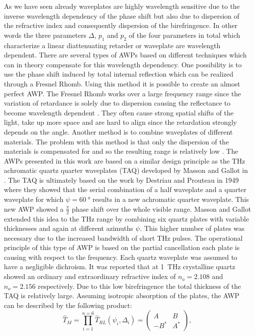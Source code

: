 As we have seen already waveplates are highly wavelength sensitive due to the inverse wavelength dependency of the phase shift but also due to dispersion of the refractive index and consequently dispersion of the birefringence. In other words the three parameters $\Delta$, $p_1$ and $p_2$ of the four parameters in total which characterize a linear diattenuating retarder or waveplate are wavelength dependent. There are several types of AWPs based on different techniques which can in theory compensate for this wavelength dependency. One possibility is to use the phase shift induced by total internal reflection which can be realized through a Fresnel Rhomb. Using this method it is possible to create an almost perfect AWP. The Fresnel Rhomb works over a large frequency range since the variation of retardance is solely due to dispersion causing the reflectance to become wavelength dependent \cite{Hecht}. They often cause strong spatial shifts of the light, take up more space and are hard to align since the retardation strongly depends on the angle. Another method is to combine waveplates of different materials. The problem with this method is that only the dispersion of the materials is compensated for and so the resulting range is relatively low \cite{Masson2006}. The AWPs presented in this work are based on a similar design principle as the THz achromatic quartz quarter waveplates (TAQ) developed by Masson and Gallot in \cite{Masson2006}. The TAQ is ultimately based on the work by Destriau and Prouteau in 1949 \cite{Destriau1949} where they showed that the serial combination of a half waveplate and a quarter waveplate for which $\psi=\SI{60}{\degree}$ results in a new achromatic quarter waveplate. This new AWP showed a $\frac{\pi}{2}$ phase shift over the whole visible range. Masson and Gallot extended this idea to the THz range by combining six quartz plates with variable thicknesses and again at different azimuths $\psi$. This higher number of plates was necessary due to the increased bandwidth of short THz pulses. The operational principle of this type of AWP is based on the partial cancellation each plate is causing with respect to the frequency. Each quartz waveplate was assumed to have a negligible dichroism. It was reported that at \SI{1}{\tera \hertz} crystalline quartz showed an ordinary and extraordinary refractive index of $n_o=2.108$ and $n_o=2.156$ respectively. Due to this low birefringence the total thickness of the TAQ is relatively large. Assuming isotropic absorption of the plates, the AWP can be described by the following product:
\begin{equation}
    \hat{T}_{M} = \prod_{i=1}^{n=6} \hat{T}_{RL}(\psi_i, \Delta_i) = 
    \begin{pmatrix} 
    A & B \\
    -B^* & A^*
    \end{pmatrix},
    \label{eq:equiv_matrix}
\end{equation}

